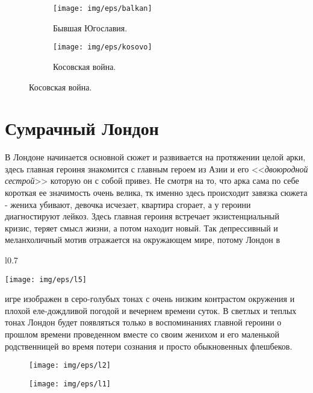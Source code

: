 \documentclass[11pt]{report}
\newenvironment{wrapfigure*}%
 {%
  \setlength{\columnsep}{15pt}%
  \wrapfloat{figure}}%
 {\endwrapfloat}
\begin{document}
\vspace{8ex}
\begin{center}
	\begin{figure}[h]
		\begin{subfigure}{.5\linewidth}
			\texttt{[image: img/eps/balkan]}
  			\caption{Бывшая Югославия.}
  			\label{img:balkans}
		\end{subfigure}
		\hfill
		\begin{subfigure}{.5\linewidth}
			\texttt{[image: img/eps/kosovo]}
  			\caption{Косовская война.}
  			\label{img:kosovar}
		\end{subfigure}
	\end{figure}
\end{center}



\newpage
\section{Сумрачный Лондон}

В Лондоне начинается основной сюжет и развивается на протяжении целой арки, здесь главная героиня знакомится с главным героем из Азии и его <<\textit{двоюродной сестрой}>> которую он с собой привез. Не смотря на то, что арка сама по себе короткая ее значимость очень велика, тк именно здесь происходит завязка сюжета - жениха убивают, девочка исчезает, квартира сгорает, а у героини диагностируют лейкоз. Здесь главная героиня встречает экзистенциальный кризис, теряет смысл жизни, а потом находит новый. Так депрессивный и меланхоличный мотив отражается на окружающем мире, потому Лондон в 
\setlength{\intextsep}{2pt}
\setlength{\columnsep}{10pt}
\begin{wrapfigure*}{l}{0.7\linewidth}
	\centering
	\begin{center}
		\texttt{[image: img/eps/l5]}
	\end{center}
\end{wrapfigure*} игре изображен в серо-голубых тонах с очень низким контрастом окружения и плохой еле-дождливой погодой и вечернем времени суток. В светлых и теплых тонах Лондон будет появляться только в воспоминаниях главной героини о прошлом времени проведенном вместе со своим женихом и его маленькой родственницей во время потери сознания и просто обыкновенных флешбеков.

\clearpage
\begin{center}
	\begin{figure}[h]
		\centering
		\begin{center}
			\texttt{[image: img/eps/l2]}
		\end{center}
		\vfill
		\vspace{0.3cm}
		\begin{center}
			\texttt{[image: img/eps/l1]}
		\end{center}
	\end{figure}
\end{center}
\end{document}
